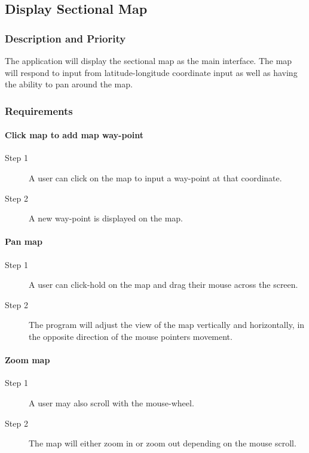 \documentclass[12pt, letterpaper]{article}
\begin{document}
  \subsection{Display Sectional Map}
    \subsubsection{Description and Priority}
      The application will display the sectional map as the main interface.
      The map will respond to input from latitude-longitude coordinate input as well
      as having the ability to pan around the map.
    \subsubsection{Requirements}
    \paragraph{Click map to add map way-point}
      \begin{description}

        \item[Step 1] A user can click on the map to input a way-point at that coordinate.
        \item[Step 2] A new way-point is displayed on the map.
      \end{description}
          \paragraph{Pan map}
          \begin{description}
        \item[Step 1] A user can click-hold on the map and drag their mouse across the screen.
        \item[Step 2] The program will adjust the view of the map vertically and horizontally,
			                  in the opposite direction of the mouse pointers movement.
        \end{description}
        \paragraph{Zoom map}
        \begin{description}
        \item[Step 1] A user may also scroll with the mouse-wheel.
        \item[Step 2] The map will either zoom in or zoom out depending on the mouse scroll.
      \end{description}
\end{document}
